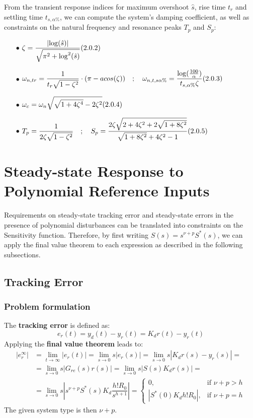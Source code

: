 \documentclass[a4paper,10pt,titlepage]{article}
\numberwithin{equation}{subsection}
\begin{document}
	
	From the transient response indices for maximum overshoot $\hat{s}$, rise time $t_r$ and settling time $t_{s,\alpha\%}$, we can compute the system's damping coefficient, as well as constraints on the natural frequency and resonance peaks $T_p$ and $S_p$:
	\begin{enumerate}
		\item[$\bullet$] $\displaystyle \zeta = \frac{\left| \log (\hat{s}) \right|}{\sqrt{\pi^2 + \log^2 (\hat{s})}} \hfill (2.0.2)$
		\item[$\bullet$] $\displaystyle \omega_{n,tr} = \frac{1}{t_r\sqrt{1-\zeta^2}} \cdot (\pi - acos(\zeta)) \quad; \quad
		\omega_{n,t,s\alpha \%} = \frac{\log(\frac{100}{\alpha})}{t_{s,\alpha \%}\zeta} \hfill (2.0.3)$
		\item[$\bullet$] $\displaystyle \omega_c = \omega_n \sqrt{\sqrt{1+4\zeta^4}-2\zeta^2} \hfill (2.0.4)$
		\item[$\bullet$] $\displaystyle T_p = \frac{1}{2\zeta \sqrt{1-\zeta^2}} \quad; \quad S_p = \frac{2\zeta \sqrt{2+4\zeta^2+2\sqrt{1+8\zeta^2}}}{\sqrt{1+8\zeta^2}+4\zeta^2-1} \hfill (2.0.5)$
	\end{enumerate}
	
	\section{Steady-state Response to Polynomial Reference Inputs}
	Requirements on steady-state tracking error and steady-state errors in the presence of polynomial disturbances can be translated into constraints on the Sensitivity function.
	Therefore, by first writing $S(s) = s^{\nu+p}S^*(s)$, we can apply the final value theorem to each expression as described in the following subsections.
	\subsection{Tracking Error}
	\subsubsection{Problem formulation}
	The \textbf{tracking error} is defined as:
	\begin{equation}
		e_r(t) = y_d(t)-y_r(t) = K_dr(t)-y_r(t)
	\end{equation}
	Applying the \textbf{final value theorem} leads to:
	\begin{align}
		\left| e_r^\infty \right| &= \displaystyle\lim_{t\to\infty} 	\left|e_r(t)\right| = \displaystyle\lim_{s\to0}s \left|e_r(s)\right| = \displaystyle\lim_{s\to0}s \left|K_dr(s)-y_r(s)\right| = \nonumber \\
		&= \displaystyle\lim_{s\to0}s \left|G_{re}(s)r(s)\right| = 	\displaystyle\lim_{s\to0}s \left|S(s)K_dr(s)\right| = \nonumber \\
		&= \displaystyle\lim_{s\to0}s 	\left|s^{\nu+p}S^*(s)K_d\dfrac{h!R_0}{s^{h+1}}\right| =
		\begin{cases}
			0, & \text{if } \nu+p>h \\
			\left|S^*(0)K_dh!R_0\right|, & \text{if } \nu+p = h
		\end{cases}
	\end{align}
	The given system type is then $\nu+p$.
\end{document}
